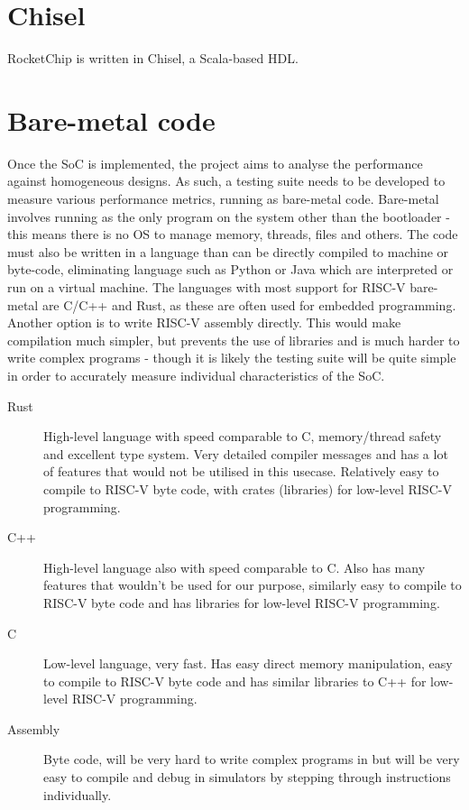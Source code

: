 \section{Chisel} %
\label{chisel}
RocketChip is written in Chisel, a Scala-based HDL. 

\section{Bare-metal code}
Once the SoC is implemented, the project aims to analyse the performance against homogeneous designs. As such, a testing suite needs to be developed to measure various performance metrics, running as bare-metal code. Bare-metal involves running as the only program on the system other than the bootloader - this means there is no OS to manage memory, threads, files and others. The code must also be written in a language than can be directly compiled to machine or byte-code, eliminating language such as Python or Java which are interpreted or run on a virtual machine. The languages with most support for RISC-V bare-metal are C/C++ and Rust, as these are often used for embedded programming. Another option is to write RISC-V assembly directly. This would make compilation much simpler, but prevents the use of libraries and is much harder to write complex programs - though it is likely the testing suite will be quite simple in order to accurately measure individual characteristics of the SoC.

\begin{description}
    \item[Rust] High-level language with speed comparable to C, memory/thread safety and excellent type system. Very detailed compiler messages and has a lot of features that would not be utilised in this usecase. Relatively easy to compile to RISC-V byte code, with crates (libraries) for low-level RISC-V programming.
    \item[C++] High-level language also with speed comparable to C. Also has many features that wouldn't be used for our purpose, similarly easy to compile to RISC-V byte code and has libraries for low-level RISC-V programming.
    \item[C] Low-level language, very fast. Has easy direct memory manipulation, easy to compile to RISC-V byte code and has similar libraries to C++ for low-level RISC-V programming.
    \item[Assembly] Byte code, will be very hard to write complex programs in but will be very easy to compile and debug in simulators by stepping through instructions individually.
\end{description}

